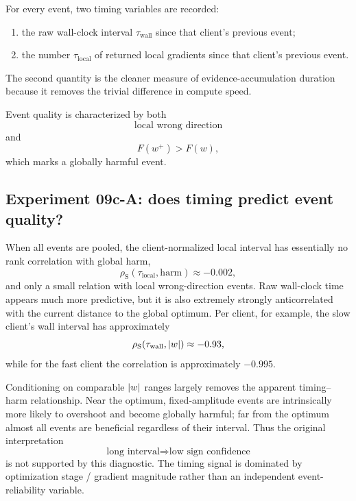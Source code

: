 For every event, two timing variables are recorded:
\begin{enumerate}[label=(\roman*)]
  \item the raw wall-clock interval \(\tau_{\mathrm{wall}}\) since that client's previous event;
  \item the number \(\tau_{\mathrm{local}}\) of returned local gradients since that client's previous event.
\end{enumerate}
The second quantity is the cleaner measure of evidence-accumulation duration because it removes the trivial difference in compute speed.

Event quality is characterized by both
\begin{equation}
  \text{local wrong direction}
\end{equation}
and
\begin{equation}
  F(w^+)>F(w),
\end{equation}
which marks a globally harmful event.

\subsection{Experiment 09c-A: does timing predict event quality?}
When all events are pooled, the client-normalized local interval has essentially no rank correlation with global harm,
\begin{equation}
  \rho_{\mathrm{S}}(\tau_{\mathrm{local}},\text{harm})\approx -0.002,
\end{equation}
and only a small relation with local wrong-direction events. Raw wall-clock time appears much more predictive, but it is also extremely strongly anticorrelated with the current distance to the global optimum. Per client, for example, the slow client's wall interval has approximately
\begin{equation}
  \rho_{\mathrm{S}}(\tau_{\mathrm{wall}},\left|w\right|)\approx -0.93,
\end{equation}
while for the fast client the correlation is approximately \(-0.995\).

Conditioning on comparable \(\left|w\right|\) ranges largely removes the apparent timing--harm relationship. Near the optimum, fixed-amplitude events are intrinsically more likely to overshoot and become globally harmful; far from the optimum almost all events are beneficial regardless of their interval. Thus the original interpretation
\begin{equation}
  \text{long interval} \Rightarrow \text{low sign confidence}
\end{equation}
is not supported by this diagnostic. The timing signal is dominated by optimization stage / gradient magnitude rather than an independent event-reliability variable.

